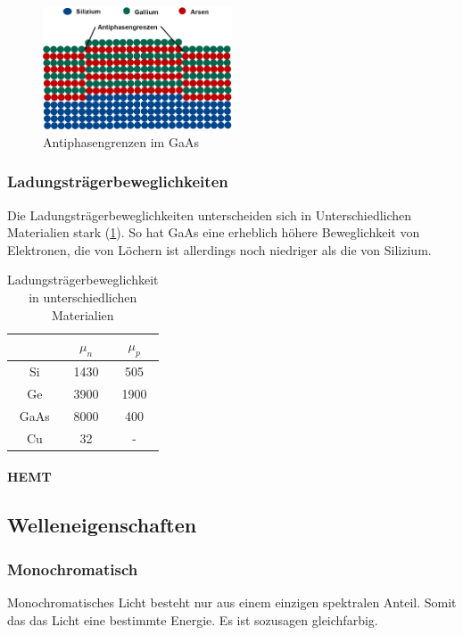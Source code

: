 	\begin{figure}[h]
		\centering
		\includegraphics[width=0.5\textwidth]{Kapitel/Kap11/antiphasen.png}
		\caption{Antiphasengrenzen im GaAs}
		\label{11_antiphase}
	\end{figure}
	
	\subsubsection{Ladungsträgerbeweglichkeiten}
	
	Die Ladungsträgerbeweglichkeiten unterscheiden sich in Unterschiedlichen Materialien stark (\ref{11_ladung}). So hat GaAs eine erheblich höhere Beweglichkeit von Elektronen, die von Löchern ist allerdings noch niedriger als die von Silizium. 
	\begin{table}[h]
		\centering
		\begin{tabular}{c|c|c}
			& $\mu_n $ & $\mu_p$ \\
			\hline
			Si & 1430 & 505 \\
			Ge & 3900 & 1900 \\
			GaAs & 8000 & 400 \\
			Cu & 32 & -\\
		\end{tabular}
		\caption{Ladungsträgerbeweglichkeit in unterschiedlichen Materialien}
		\label{11_ladung}
	\end{table}
	\paragraph{HEMT} 
\subsection{Welleneigenschaften}
	\subsubsection{Monochromatisch}
	Monochromatisches Licht besteht nur aus einem einzigen spektralen Anteil. Somit das das Licht eine bestimmte Energie. Es ist sozusagen gleichfarbig.
